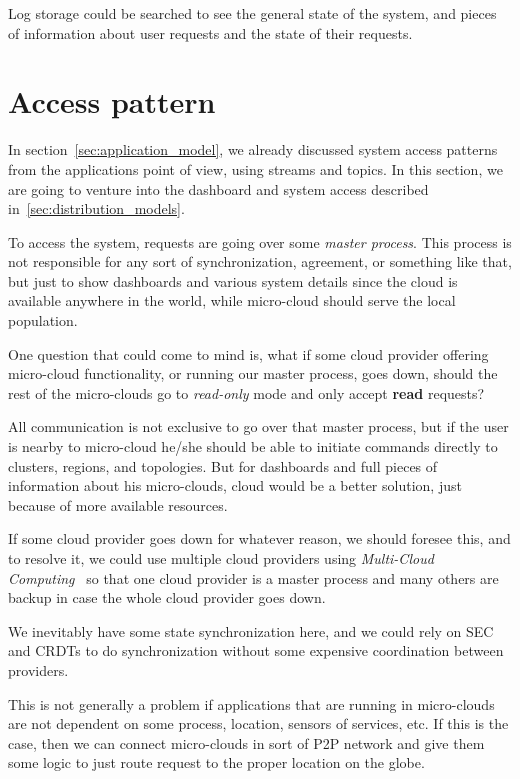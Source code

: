 Log storage could be searched to see the general state of the system, and pieces of information about user requests and the state of their requests.
%
%
\section{Access pattern}\label{sec:access_pattern}
%
In section~\ref{sec:application_model}, we already discussed system access patterns from the applications point of view, using streams and topics. In this section, we are going to venture into the dashboard and system access described in~\ref{sec:distribution_models}. 

To access the system, requests are going over some \textit{master process}. This process is not responsible for any sort of synchronization, agreement, or something like that, but just to show dashboards and various system details since the cloud is available anywhere in the world, while micro-cloud should serve the local population. 

One question that could come to mind is, what if some cloud provider offering micro-cloud functionality, or running our master process, goes down, should the rest of the micro-clouds go to \textit{read-only} mode and only accept \textbf{read} requests?

All communication is not exclusive to go over that master process, but if the user is nearby to micro-cloud he/she should be able to initiate commands directly to clusters, regions, and topologies. But for dashboards and full pieces of information about his micro-clouds, cloud would be a better solution, just because of more available resources.

If some cloud provider goes down for whatever reason, we should foresee this, and to resolve it, we could use multiple cloud providers using \textit{Multi-Cloud Computing}~\cite{HongDSH19, Ardagna15} so that one cloud provider is a master process and many others are backup in case the whole cloud provider goes down.

We inevitably have some state synchronization here, and we could rely on SEC and CRDTs to do synchronization without some expensive coordination between providers.

This is not generally a problem if applications that are running in micro-clouds are not dependent on some process, location, sensors of services, etc. If this is the case, then we can connect micro-clouds in sort of P2P network and give them some logic to just route request to the proper location on the globe. 

